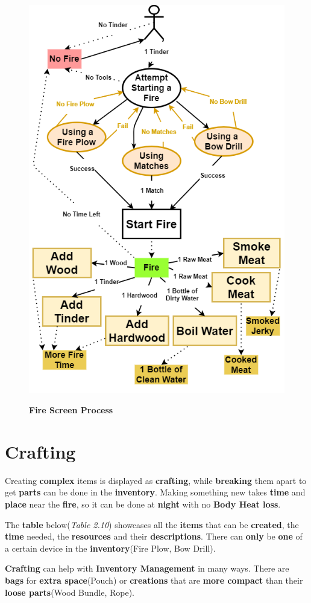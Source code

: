 		\begin{figure}[H]
			\centering
			\includegraphics[width=15cm, height=17cm, keepaspectratio]{Images/FireUseCase.png}\\
			\caption{\textbf{Fire Screen Process}}
		\end{figure}


\section{Crafting}
		\par Creating \textbf{complex} items is displayed as \textbf{crafting}, while \textbf{breaking} them apart to get \textbf{parts} can be done in the \textbf{inventory}. Making something new takes \textbf{time} and \textbf{place} near the \textbf{fire}, so it can be done at \textbf{night} with no \textbf{Body Heat loss}.
		\par The \textbf{table} below(\textit{Table 2.10}) showcases all the \textbf{items} that can be \textbf{created}, the \textbf{time} needed, the \textbf{resources} and their \textbf{descriptions}. There can \textbf{only} be \textbf{one} of a certain device in the \textbf{inventory}(Fire Plow, Bow Drill).
		\par \textbf{Crafting} can help with \textbf{Inventory Management} in many ways. There are \textbf{bags} for \textbf{extra space}(Pouch) or \textbf{creations} that are \textbf{more compact} than their \textbf{loose parts}(Wood Bundle, Rope).

